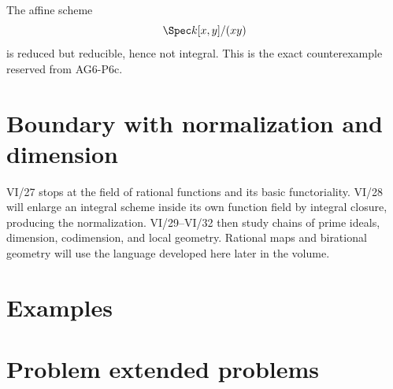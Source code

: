 The affine scheme
\[
\Spec k[x,y]/(xy)
\]
is reduced but reducible, hence not integral.  This is the exact counterexample reserved from AG6-P6c.



\section{Boundary with normalization and dimension}
VI/27 stops at the field of rational functions and its basic functoriality.  VI/28 will enlarge an integral scheme
inside its own function field by integral closure, producing the normalization.  VI/29--VI/32 then study chains of
prime ideals, dimension, codimension, and local geometry.  Rational maps and birational geometry will use the
language developed here later in the volume.

\section{Examples}



\section{Problem extended problems}





















